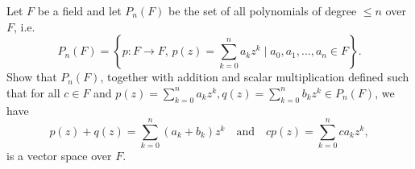 \begin{exer}\label{exer:pnvs}
Let $ F $ be a field and let $ P_n(F) $ be the set of all polynomials of degree $ \leq n $ over $ F $, i.e.
\begin{equation*}
    P_n(F)=\left\{p:F\to F,\,p(z)=\sum_{k=0}^n a_k z^k\mid a_0,a_1,\ldots,a_n\in F\right\}.
\end{equation*}
Show that $ P_n(F) $, together with addition and scalar multiplication defined such that for all $ c\in F $ and $ p(z)=\sum_{k=0}^n a_k z^k,q(z)=\sum_{k=0}^n b_k z^k\in P_n(F) $, we have
\begin{equation*}
    p(z)+q(z)=\sum_{k=0}^n (a_k+b_k)z^k \quad\text{and}\quad cp(z)=\sum_{k=0}^n ca_k z^k,
\end{equation*}
is a vector space over $ F $.
\end{exer}